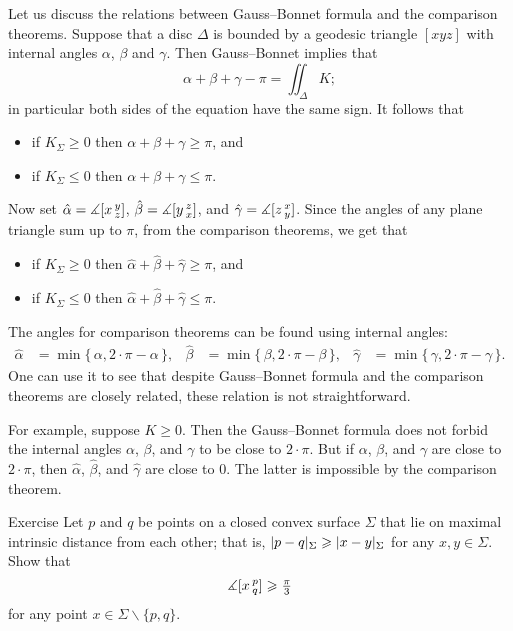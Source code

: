 Let us discuss the relations between Gauss--Bonnet formula and the comparison theorems.
Suppose that a disc $\Delta$ is bounded by a geodesic triangle $[xyz]$ with internal angles $\alpha$, $\beta$ and $\gamma$.
Then Gauss--Bonnet implies that 
\[\alpha+\beta+\gamma-\pi=\iint_\Delta K;\]
in particular both sides of the equation have the same sign.
It follows that
\begin{itemize}
\item if $K_\Sigma\ge 0$ then $\alpha+\beta+\gamma\ge\pi$, and
\item if $K_\Sigma\le 0$ then $\alpha+\beta+\gamma\le\pi$.
\end{itemize}

Now set 
$\hat\alpha=\measuredangle[x\,{}^{y}_{z}]$,
$\hat\beta=\measuredangle[y\,{}^{z}_{x}]$,
and $\hat\gamma=\measuredangle[z\,{}^{x}_{y}]$.
Since the angles of any plane triangle sum up to $\pi$, from the comparison theorems, we get that
\begin{itemize}
\item if $K_\Sigma\ge 0$ then $\hat\alpha+\hat\beta+\hat\gamma\ge\pi$, and
\item if $K_\Sigma\le 0$ then $\hat\alpha+\hat\beta+\hat\gamma\le\pi$.
\end{itemize}

The angles for comparison theorems can be found using internal angles: 
\begin{align*}
\hat \alpha&=\min\{\,\alpha,2\cdot\pi-\alpha\,\},
&
\hat\beta &=\min\{\,\beta,2\cdot\pi-\beta\,\},
&
\hat\gamma&=\min\{\,\gamma,2\cdot\pi-\gamma\,\}.
\end{align*}
One can use it to see that despite Gauss--Bonnet formula and the comparison theorems are closely related,
these relation is not straightforward.

For example, suppose $K\ge 0$.
Then the Gauss--Bonnet formula does not forbid the internal angles $\alpha$, $\beta$, and $\gamma$ to be close to $2\cdot\pi$.
But if $\alpha$, $\beta$, and $\gamma$ are close to $2\cdot\pi$, then $\hat\alpha$, $\hat\beta$, and $\hat\gamma$ are close to $0$.
The latter is impossible by the comparison theorem.


\begin{thm}{Exercise}\label{ex:diam-angle}
Let $p$ and $q$ be points on a closed convex surface $\Sigma$ that lie on maximal intrinsic distance from each other;
that is, $|p\z-q|_\Sigma\ge|x-y|_\Sigma$ for any $x,y\in \Sigma$.
Show that 
\[\measuredangle[x\,{}^{p}_{q}]\geqslant \tfrac\pi3\]
for any point $x\in \Sigma\backslash\{p,q\}$.
\end{thm}

